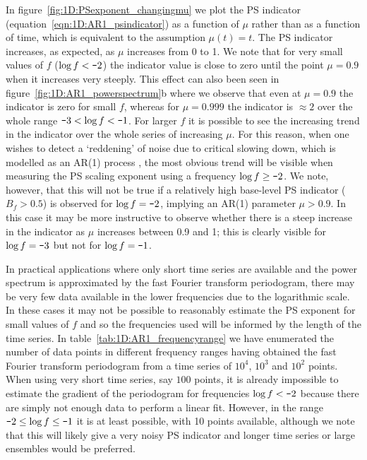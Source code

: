 {{In figure~\ref{fig:1D:PSexponent_changingmu} we plot the PS indicator (equation~\ref{eqn:1D:AR1_psindicator}) as a function of $\mu$ rather than as a function of time, which is equivalent to the assumption $\mu(t)=t$. The PS indicator increases, as expected, as $\mu$ increases from 0 to 1. We note that for very small values of $f$ ($\log f<\textup{\texttt{-}}2$) the indicator value is close to zero until the point $\mu=0.9$ when it increases very steeply. This effect can also been seen in figure~\ref{fig:1D:AR1_powerspectrum}b where we observe that even at $\mu=0.9$ the indicator is zero for small $f$, whereas for $\mu = 0.999$ the indicator is $\approx 2$ over the whole range $\textup{\texttt{-}}3<\log f<\textup{\texttt{-}}1$.  For larger $f$ it is possible to see the increasing trend in the indicator over the whole series of increasing $\mu$. For this reason, when one wishes to detect a `reddening' of noise due to critical slowing down, which is modelled as an AR(1) process \citep{ashwin2012}, the most obvious trend will be visible when measuring the PS scaling exponent using a frequency $\log f\geq\textup{\texttt{-}}2$. We note, however, that this will not be true if a relatively high base-level PS indicator ($B_f>0.5$) is observed for $\log f=\textup{\texttt{-}}2$, implying an AR(1) parameter $\mu>0.9$. In this case it may be more instructive to observe whether there is a steep increase in the indicator as $\mu$ increases between 0.9 and 1; this is clearly visible for $\log f=\textup{\texttt{-}}3$ but not for $\log f=\textup{\texttt{-}}1$. 

In practical applications where only short time series are available and the power spectrum is approximated by the fast Fourier transform periodogram, there may be very few data available in the lower frequencies due to the logarithmic scale. In these cases it may not be possible to reasonably estimate the PS exponent for small values of $f$ and so the frequencies used will be informed by the length of the time series. In table~\ref{tab:1D:AR1_frequencyrange} we have enumerated the number of data points in different frequency ranges having obtained the fast Fourier transform periodogram from a time series of $10^4$, $10^3$ and $10^2$ points. When using very short time series, say $100$ points, it is already impossible to estimate the gradient of the periodogram for frequencies $\log f<\textup{\texttt{-}}2$ because there are simply not enough data to perform a linear fit. However, in the range $\textup{\texttt{-}}2\leq\log f\leq\textup{\texttt{-}}1$ it is at least possible, with 10 points available, although we note that this will likely give a very noisy PS indicator and longer time series or large ensembles would be preferred.

}}
